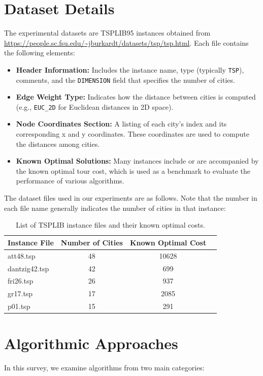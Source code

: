 \documentclass[11pt]{article}
\begin{document}
	\section{Dataset Details}
	The experimental datasets are TSPLIB95 instances obtained from \url{https://people.sc.fsu.edu/~jburkardt/datasets/tsp/tsp.html}. Each file contains the following elements:
	\begin{itemize}[noitemsep]
		\item \textbf{Header Information:} Includes the instance name, type (typically \texttt{TSP}), comments, and the \texttt{DIMENSION} field that specifies the number of cities.
		\item \textbf{Edge Weight Type:} Indicates how the distance between cities is computed (e.g., \texttt{EUC\_2D} for Euclidean distances in 2D space).
		\item \textbf{Node Coordinates Section:} A listing of each city's index and its corresponding x and y coordinates. These coordinates are used to compute the distances among cities.
		\item \textbf{Known Optimal Solutions:} Many instances include or are accompanied by the known optimal tour cost, which is used as a benchmark to evaluate the performance of various algorithms.
	\end{itemize}
	
	The dataset files used in our experiments are as follows. Note that the number in each file name generally indicates the number of cities in that instance:
	
	\begin{table}[H]
		\centering
		\begin{tabular}{lccc}
			\toprule
			Instance File    & Number of Cities & Known Optimal Cost \\
			\midrule
			att48.tsp      & 48              & 10628 \\
			dantzig42.tsp  & 42              & 699 \\
			fri26.tsp      & 26              & 937 \\
			gr17.tsp       & 17              & 2085 \\
			p01.tsp        & 15              & 291 \\
			\bottomrule
		\end{tabular}
		\caption{List of TSPLIB instance files and their known optimal costs.}
		\label{table:tsplib}
	\end{table}
	
	\section{Algorithmic Approaches}
	In this survey, we examine algorithms from two main categories:
	
\end{document}
